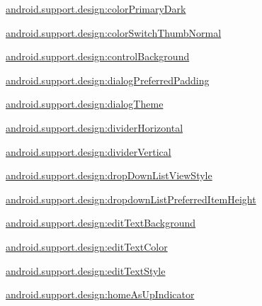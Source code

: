 {\ttfamily \hyperlink{classandroid_1_1support_1_1design_1_1R_1_1styleable_a14ae278c8d0811cc9be02dcb6df531a3}{android.\+support.\+design\+:color\+Primary\+Dark}}

{\ttfamily \hyperlink{classandroid_1_1support_1_1design_1_1R_1_1styleable_a70a2af057154b1ea10f13cd045700a22}{android.\+support.\+design\+:color\+Switch\+Thumb\+Normal}}

{\ttfamily \hyperlink{classandroid_1_1support_1_1design_1_1R_1_1styleable_aea175cd3ba91e27d8d492e92dd519ac9}{android.\+support.\+design\+:control\+Background}}

{\ttfamily \hyperlink{classandroid_1_1support_1_1design_1_1R_1_1styleable_a404189687f7f202b9ed1a661ce3ac355}{android.\+support.\+design\+:dialog\+Preferred\+Padding}}

{\ttfamily \hyperlink{classandroid_1_1support_1_1design_1_1R_1_1styleable_af6160d10b114a6eb6ee2f89975605153}{android.\+support.\+design\+:dialog\+Theme}}

{\ttfamily \hyperlink{classandroid_1_1support_1_1design_1_1R_1_1styleable_a5366d4aaeb8ade180e8f192c8c58366f}{android.\+support.\+design\+:divider\+Horizontal}}

{\ttfamily \hyperlink{classandroid_1_1support_1_1design_1_1R_1_1styleable_a8a5a682e061f30c7bd82fc522c70f245}{android.\+support.\+design\+:divider\+Vertical}}

{\ttfamily \hyperlink{classandroid_1_1support_1_1design_1_1R_1_1styleable_aef3b0acbfc00c4f336874396809841c3}{android.\+support.\+design\+:drop\+Down\+List\+View\+Style}}

{\ttfamily \hyperlink{classandroid_1_1support_1_1design_1_1R_1_1styleable_a2bcc01dd4cd3ad74d4af832f4d79af52}{android.\+support.\+design\+:dropdown\+List\+Preferred\+Item\+Height}}

{\ttfamily \hyperlink{classandroid_1_1support_1_1design_1_1R_1_1styleable_a1ee151d494fb454277ff281e425c5556}{android.\+support.\+design\+:edit\+Text\+Background}}

{\ttfamily \hyperlink{classandroid_1_1support_1_1design_1_1R_1_1styleable_af735eb4a960975c07d0f92771af6d22c}{android.\+support.\+design\+:edit\+Text\+Color}}

{\ttfamily \hyperlink{classandroid_1_1support_1_1design_1_1R_1_1styleable_acc9842f5a15682537a17a07297b3d1fa}{android.\+support.\+design\+:edit\+Text\+Style}}

{\ttfamily \hyperlink{classandroid_1_1support_1_1design_1_1R_1_1styleable_a1b9f70963e0781f0c4c4e47161f8cb0f}{android.\+support.\+design\+:home\+As\+Up\+Indicator}}


